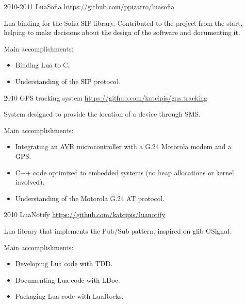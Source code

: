 \documentclass[]{friggeri-cv} %
\begin{document}
\begin{entrylist}
\entry
{2010-2011}
{LuaSofia}
{\href{https://github.com/ppizarro/luasofia}{https://github.com/ppizarro/luasofia}}
{

Lua binding for the Sofia-SIP library.
Contributed to the project from the start, helping to make decisions about the design of the software and documenting it.

Main accomplishments:\\
\begin{itemize}
\item Binding Lua to C.
\item Understanding of the SIP protocol.
\end{itemize}
}
\end{entrylist}

\begin{entrylist}
\entry
{2010}
{GPS tracking system}
{\href{https://github.com/katcipis/gps.tracking}{https://github.com/katcipis/gps.tracking}}
{

System designed to provide the location of a device through SMS. 

Main accomplishments:\\
\begin{itemize}
\item Integrating an AVR microcontroller with a G.24 Motorola modem and a GPS.
\item C++ code optimized to embedded systems (no heap allocations or kernel involved).
\item Understanding of the Motorola G.24 AT protocol.
\end{itemize}
}
\end{entrylist}

\begin{entrylist}
\entry
{2010}
{LuaNotify}
{\href{https://github.com/katcipis/luanotify}{https://github.com/katcipis/luanotify}}
{

Lua library that implements the Pub/Sub pattern, inspired on glib GSignal.

Main accomplishments:\\
\begin{itemize}
\item Developing Lua code with TDD.
\item Documenting Lua code with LDoc.
\item Packaging Lua code with LuaRocks.
\end{itemize}
}
\end{entrylist}
\end{document}
